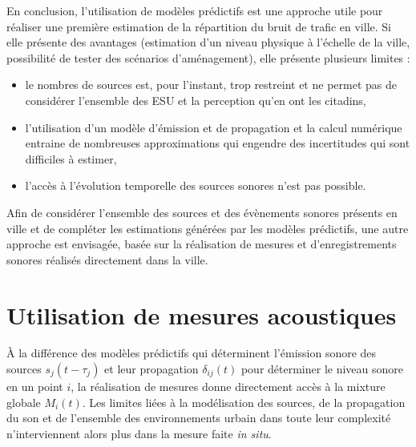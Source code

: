 En conclusion, l'utilisation de modèles prédictifs est une approche utile pour réaliser une première estimation de la répartition du bruit de trafic en ville. Si elle présente des avantages (estimation d'un niveau physique à l'échelle de la ville, possibilité de tester des scénarios d'aménagement), elle présente plusieurs limites : 

\begin{itemize}
\item le nombres de sources est, pour l'instant, trop restreint et ne permet pas de considérer l'ensemble des ESU et la perception qu'en ont les citadins,
\item l'utilisation d'un modèle d'émission et de propagation et la calcul numérique entraine de nombreuses approximations qui engendre des incertitudes qui sont difficiles à estimer, 
\item l'accès à l'évolution temporelle des sources sonores n'est pas possible.
\end{itemize}

Afin de considérer l'ensemble des sources et des évènements sonores présents en ville et de compléter les estimations générées par les modèles prédictifs, une autre approche est envisagée, basée sur la réalisation de mesures et d'enregistrements sonores réalisés directement dans la ville.

\section{Utilisation de mesures acoustiques}

À la différence des modèles prédictifs qui déterminent l'émission sonore des sources $s_j(t -\tau_j)$ et leur propagation $\delta_{ij}(t)$ pour déterminer le niveau sonore en un point $i$, la réalisation de mesures donne directement accès à la mixture globale $M_{i}(t)$. Les limites liées à la modélisation des sources, de la propagation du son et de l'ensemble des environnements urbain dans toute leur complexité n'interviennent alors plus dans la mesure faite \textit{in situ}.

